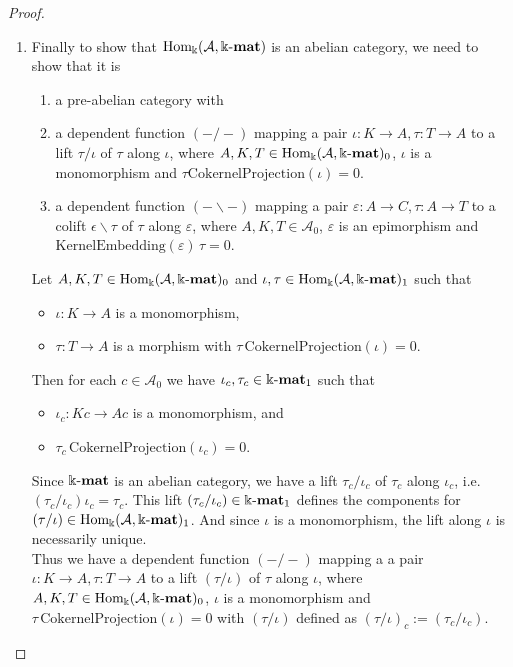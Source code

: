 \begin{proof}
\begin{enumerate}
\item Finally to show that $\mathrm{Hom_{\Bbbk}}(\mathcal{A},\Bbbk\textnormal{-}\mathbf{mat})$ is an abelian category, we need to show that it is
\begin{enumerate}
\renewcommand{\labelenumii}{(\roman{enumii})}
\item a pre-abelian category with
\item a dependent function $(-/-)$ mapping a pair $\iota : K \rightarrow A, \tau : T \rightarrow A$ to a lift $\tau / \iota$ of
$\tau$ along $\iota$, where $A, K, T \in \mathrm{Hom_{\Bbbk}}(\mathcal{A},\Bbbk\textnormal{-}\mathbf{mat})_{0}$, $\iota$ is a monomorphism and $\tau \mathrm{CokernelProjection}(\iota) = 0$.
\item a dependent function $(-\backslash -)$ mapping a pair $\varepsilon : A \rightarrow C, \tau : A \rightarrow T$ to a colift
$\epsilon \backslash \tau$ of $\tau$ along $\varepsilon$, where $A, K, T \in \mathcal{A}_{0}$, $\varepsilon$ is an epimorphism and
$\mathrm{KernelEmbedding}(\varepsilon)\,\tau = 0$.
\end{enumerate}
\begin{subproof}
Let $A, K, T \in \mathrm{Hom_{\Bbbk}}(\mathcal{A},\Bbbk\textnormal{-}\mathbf{mat})_{0}$ and $\iota, \tau \in \mathrm{Hom_{\Bbbk}}(\mathcal{A},\Bbbk\textnormal{-}\mathbf{mat})_{1}$ such that 
\begin{itemize}
\item $\iota : K \rightarrow A$ is a monomorphism,
\item $\tau : T \rightarrow A$ is a morphism with $\tau \, \mathrm{CokernelProjection}(\iota) = 0$.
\end{itemize}
Then for each $c \in \mathcal{A}_{0}$ we have $\iota_{c}, \tau_{c} \in \Bbbk\textnormal{-}\mathbf{mat}_{1}$ such that
\begin{itemize}
\item $\iota_{c} : Kc \rightarrow Ac$ is a monomorphism, and
\item $\tau_{c} \, \mathrm{CokernelProjection}(\iota_{c}) = 0$.
\end{itemize}
Since $\Bbbk\textnormal{-}\mathbf{mat}$ is an abelian category, we have a lift $\tau_{c} / \iota_{c}$ of $\tau_{c}$ along $\iota_{c}$, i.e.
$(\tau_{c} / \iota_{c}) \iota_{c} = \tau_{c}$.
This lift $(\tau_{c} / \iota_{c}) \in \Bbbk\textnormal{-}\mathbf{mat}_{1}$ defines the components for $(\tau / \iota) \in \mathrm{Hom_{\Bbbk}}(\mathcal{A},\Bbbk\textnormal{-}\mathbf{mat})_{1}$. And since
$\iota$ is a monomorphism, the lift along $\iota$ is necessarily unique.\\
Thus we have a dependent function $( - / - )$ mapping a
a pair $\iota : K \rightarrow A, \tau : T \rightarrow A$ to a lift $(\tau / \iota)$ of
$\tau$ along $\iota$, where $A, K, T \in \mathrm{Hom_{\Bbbk}}(\mathcal{A},\Bbbk\textnormal{-}\mathbf{mat})_{0}$, $\iota$ is a monomorphism and $\tau \, \mathrm{CokernelProjection}(\iota) = 0$
with $(\tau / \iota)$ defined as $(\tau / \iota)_{c} := (\tau_{c} / \iota_{c})$.



\end{subproof}
\end{enumerate}
\end{proof}


